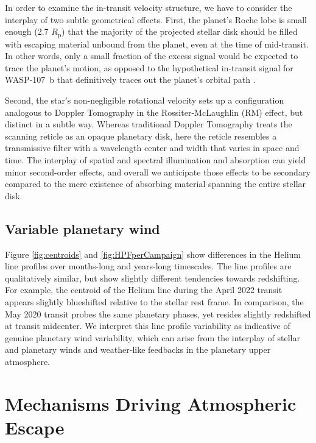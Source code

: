 \documentclass[twocolumn]{aastex631}
\begin{document}
In order to examine the in-transit velocity structure, we have to consider the interplay of two subtle geometrical effects.  First, the planet's Roche lobe is small enough (2.7 $R_\mathrm{p}$) that the majority of the projected stellar disk should be filled with escaping material unbound from the planet, even at the time of mid-transit.  In other words, only a small fraction of the  excess signal would be expected to trace the planet's motion, as opposed to the hypothetical in-transit signal for WASP-107~b that definitively traces out the planet's orbital path \citep{2022ApJ...926..226M}.

Second, the star's non-negligible rotational velocity sets up a configuration analogous to Doppler Tomography in the Rossiter-McLaughlin (RM) effect, but distinct in a subtle way.  Whereas traditional Doppler Tomography treats the scanning reticle as an opaque planetary disk, here the reticle resembles a transmissive filter with a wavelength center and width that varies in space and time.  The interplay of spatial and spectral illumination and absorption can yield minor second-order effects, and overall we anticipate those effects to be secondary compared to the mere existence of absorbing material spanning the entire stellar disk.

\subsection{Variable planetary wind}
Figure \ref{fig:centroids} and \ref{fig:HPFperCampaign} show differences in the Helium line profiles over months-long and years-long timescales.  The line profiles are qualitatively similar, but show slightly different tendencies towards redshifting.  For example, the centroid of the Helium line during the April 2022 transit appears slightly blueshifted relative to the stellar rest frame.  In comparison, the May 2020 transit probes the same planetary phases, yet resides slightly redshifted at transit midcenter.  We interpret this line profile variability as indicative of genuine planetary wind variability, which can arise from the interplay of stellar and planetary winds \citep{2009ApJ...693...23M} and weather-like feedbacks in the planetary upper atmosphere.

\section{Mechanisms Driving Atmospheric Escape}\label{secPhysMech}
\end{document}
